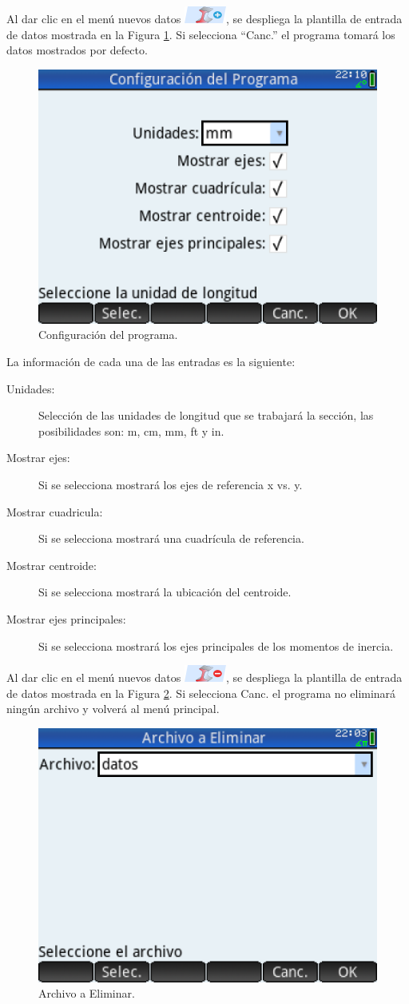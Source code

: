\documentclass[spanish,xcolor=pdftex,dvipsnames,table,mathserif]{scrartcl}
\begin{document}
Al dar clic en el menú nuevos datos \includegraphics{imagenes/men_nuevo}, se despliega la plantilla de entrada de datos mostrada en la Figura \ref{fig:datosseccion}. Si selecciona ``Canc.'' el programa tomará los datos mostrados por defecto.

\begin{figure}[H]
	\centering
	\caption[Datos de la Viga.]{Configuración del programa.}
	\label{fig:datosseccion}
	\includegraphics[width=0.45\linewidth]{imagenes/datosSeccion}
\end{figure}
La información de cada una de las entradas es la siguiente:
\begin{description}
	\item[Unidades:] Selección de las unidades de longitud que se trabajará la sección, las posibilidades son: m, cm, mm, ft y in.
	\item[Mostrar ejes:] Si se selecciona mostrará los ejes de referencia x vs. y. 
	\item[Mostrar cuadricula:] Si se selecciona mostrará una cuadrícula de referencia.
	\item[Mostrar centroide:]  Si se selecciona mostrará la ubicación del centroide.
	\item[Mostrar ejes principales:]  Si se selecciona mostrará los ejes principales de los momentos de inercia.
\end{description}
Al dar clic en el menú nuevos datos \includegraphics{imagenes/men_eliminar}, se despliega la plantilla de entrada de datos mostrada en la Figura \ref{fig:archivoeliminar}. Si selecciona Canc. el programa no eliminará ningún archivo y volverá al menú principal.
\begin{figure}[H]
	\centering
	\caption[Archivo a Eliminar]{Archivo a Eliminar.}
	\label{fig:archivoeliminar}
	\includegraphics[width=0.45\linewidth]{imagenes/archivoEliminar}
\end{figure}
\end{document}
